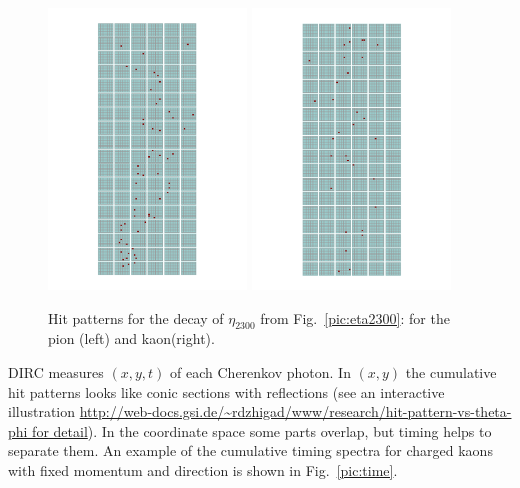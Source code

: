 \documentclass[11pt, a4paper]{article}
\begin{document}
\begin{figure}[h]
\centering
\includegraphics[angle=270,width=0.47\textwidth]{pics/pion_eta2300.pdf} \hspace{0.5cm} \includegraphics[angle=270,width=0.47\textwidth]{pics/kaon_eta2300.pdf}
\caption{\label{pic:hitpat1}
Hit patterns for the decay of $\eta_{2300}$ from Fig.~\ref{pic:eta2300}: for the pion (left) and kaon(right).
}
\end{figure}

DIRC measures $(x,y,t)$ of each Cherenkov photon. In $(x,y)$ the cumulative hit patterns looks like conic sections with reflections (see an interactive illustration \url{http://web-docs.gsi.de/~rdzhigad/www/research/hit-pattern-vs-theta-phi for detail}). In the coordinate space some parts overlap, but timing helps to separate them.
An example of the cumulative timing spectra for charged kaons with fixed momentum and direction is shown in Fig.~\ref{pic:time}. 
\end{document}
